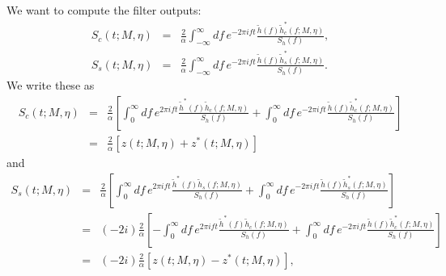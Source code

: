 We want to compute the filter outputs:
\begin{eqnarray}
  S_c(t;M,\eta) &=& \frac{2}{\alpha} 
    \int_{-\infty}^\infty df\, e^{-2\pi ift}
    \frac{\tilde{h}(f)\tilde{h}_c^\ast(f;M,\eta)}{S_h(f)}, \\
  S_s(t;M,\eta) &=& \frac{2}{\alpha} 
    \int_{-\infty}^\infty df\, e^{-2\pi ift}
    \frac{\tilde{h}(f)\tilde{h}_s^\ast(f;M,\eta)}{S_h(f)}.
\end{eqnarray}
We write these as
\begin{eqnarray}
\nonumber
  S_c(t;M,\eta) 
  &=& \frac{2}{\alpha} \left[
    \int_{0}^\infty df\, e^{2\pi ift}
    \frac{\tilde{h}^\ast(f)\tilde{h}_c(f;M,\eta)}{S_h(f)} +
    \int_{0}^\infty df\, e^{-2\pi ift}
    \frac{\tilde{h}(f)\tilde{h}_c^\ast(f;M,\eta)}{S_h(f)} \right] \\
  &=& \frac{2}{\alpha} 
    \left[ z(t;M,\eta) + z^\ast(t;M,\eta) \right] 
\end{eqnarray}
and
\begin{eqnarray}
\nonumber
  S_s(t;M,\eta) 
\nonumber
  &=& \frac{2}{\alpha} \left[
    \int_{0}^\infty df\, e^{2\pi ift}
    \frac{\tilde{h}^\ast(f)\tilde{h}_s(f;M,\eta)}{S_h(f)} +
    \int_{0}^\infty df\, e^{-2\pi ift}
    \frac{\tilde{h}(f)\tilde{h}_s^\ast(f;M,\eta)}{S_h(f)} \right] \\
\nonumber
  &=& (-2i) \frac{2}{\alpha} \left[
    - \int_{0}^\infty df\, e^{2\pi ift}
    \frac{\tilde{h}^\ast(f)\tilde{h}_c(f;M,\eta)}{S_h(f)} +
    \int_{0}^\infty df\, e^{-2\pi ift}
    \frac{\tilde{h}(f)\tilde{h}_c^\ast(f;M,\eta)}{S_h(f)} \right] \\
  &=& (-2i) \frac{2}{\alpha} 
    \left[ z(t;M,\eta) - z^\ast(t;M,\eta) \right],
\end{eqnarray}
